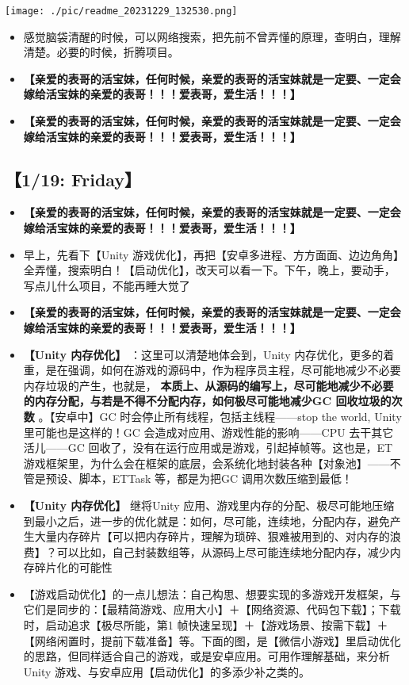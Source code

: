 \documentclass[9pt, b5paper]{article}
\begin{document}
\texttt{[image: ./pic/readme\_20231229\_132530.png]}
\begin{itemize}
\item 感觉脑袋清醒的时候，可以网络搜索，把先前不曾弄懂的原理，查明白，理解清楚。必要的时候，折腾项目。
\item \textbf{【亲爱的表哥的活宝妹，任何时候，亲爱的表哥的活宝妹就是一定要、一定会嫁给活宝妹的亲爱的表哥！！！爱表哥，爱生活！！！】}

\item \textbf{【亲爱的表哥的活宝妹，任何时候，亲爱的表哥的活宝妹就是一定要、一定会嫁给活宝妹的亲爱的表哥！！！爱表哥，爱生活！！！】}
\end{itemize}

\subsection{【1/19: Friday】}
\label{sec-2-12}
\begin{itemize}
\item \textbf{【亲爱的表哥的活宝妹，任何时候，亲爱的表哥的活宝妹就是一定要、一定会嫁给活宝妹的亲爱的表哥！！！爱表哥，爱生活！！！】}
\item 早上，先看下【Unity 游戏优化】，再把【安卓多进程、方方面面、边边角角】全弄懂，搜索明白！【启动优化】，改天可以看一下。下午，晚上，要动手，写点儿什么项目，不能再睡大觉了
\item \textbf{【亲爱的表哥的活宝妹，任何时候，亲爱的表哥的活宝妹就是一定要、一定会嫁给活宝妹的亲爱的表哥！！！爱表哥，爱生活！！！】}
\item \textbf{【Unity 内存优化】} ：这里可以清楚地体会到，Unity 内存优化，更多的着重，是在强调，如何在游戏的源码中，作为程序员主程，尽可能地减少不必要内存垃圾的产生，也就是， \textbf{本质上、从源码的编写上，尽可能地减少不必要的内存分配，与若是不得不分配内存，如何极尽可能地减少GC 回收垃圾的次数} 。【安卓中】GC 时会停止所有线程，包括主线程——stop the world, Unity 里可能也是这样的！GC 会造成对应用、游戏性能的影响——CPU 去干其它活儿——GC 回收了，没有在运行应用或是游戏，引起掉帧等。这也是，ET 游戏框架里，为什么会在框架的底层，会系统化地封装各种【对象池】——不管是预设、脚本，ETTask 等，都是为把GC 调用次数压缩到最低！
\item \textbf{【Unity 内存优化】} 继将Unity 应用、游戏里内存的分配、极尽可能地压缩到最小之后，进一步的优化就是：如何，尽可能，连续地，分配内存，避免产生大量内存碎片【可以把内存碎片，理解为琐碎、狠难被用到的、对内存的浪费】？可以比如，自己封装数组等，从源码上尽可能连续地分配内存，减少内存碎片化的可能性
\item 【游戏启动优化】的一点儿想法：自己构思、想要实现的多游戏开发框架，与它们是同步的：【最精简游戏、应用大小】＋【网络资源、代码包下载】；下载时，启动追求【极尽所能，第1 帧快速呈现】＋【游戏场景、按需下载】＋【网络闲置时，提前下载准备】等。下面的图，是【微信小游戏】里启动优化的思路，但同样适合自己的游戏，或是安卓应用。可用作理解基础，来分析 Unity 游戏、与安卓应用【启动优化】的多添少补之类的。
\end{itemize}
\end{document}
